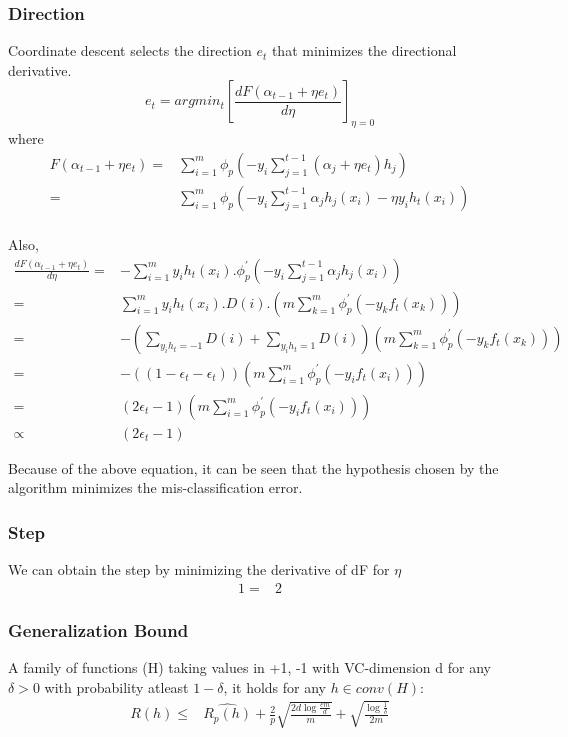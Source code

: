 \documentclass{article}
\begin{document}
\subsubsection*{Direction}
Coordinate descent selects the direction $e_{t}$ that minimizes the directional derivative.
\begin{equation*}
  e_{t} = argmin_{t}{[\frac{dF(\alpha_{t-1} + \eta e_{t} )}{d\eta}]}_{\eta = 0}
\end{equation*}
where 
\begin{align*}
  F(\alpha_{t-1} + \eta e_{t} ) = & \sum_{i=1}^{m} \phi_{p} \left( -y_{i}\sum_{j=1}^{t-1} (\alpha_{j} + \eta e_{t})h_{j} \right) \\
  = & \sum_{i=1}^{m} \phi_{p} \left( -y_{i}\sum_{j=1}^{t-1} \alpha_{j}h_{j}(x_{i}) - \eta y_{i}h_{t}(x_{i}) \right)\\
\end{align*}

Also,
\begin{align*}
  \frac{dF(\alpha_{t-1} + \eta e_{t} )}{d\eta} = & -\sum_{i=1}^{m} y_{i}h_{t}(x_{i}).\phi^{'}_{p} \left( -y_{i}\sum_{j=1}^{t-1} \alpha_{j}h_{j}(x_{i}) \right) \\
  = & \sum_{i=1}^{m} y_{i}h_{t}(x_{i}).D(i).\left(m\sum_{k=1}^{m} \phi^{'}_{p}(-y_{k}f_{t}(x_{k})) \right) \\
  = & -\left(\sum_{y_{i}h_{t} = -1}D(i) + \sum_{y_{i}h_{t} = 1} D(i) \right) \left(m \sum_{k=1}^{m} \phi^{'}_{p}(-y_{k}f_{t}(x_{k}))\right) \\
  = & -\left( (1 - \epsilon_{t} - \epsilon_{t}) \right) \left( m\sum_{i = 1}^{m}\phi^{'}_{p} (-y_{i}f_{t}(x_{i})) \right) \\
  = & (2\epsilon_{t} - 1)\left( m\sum_{i = 1}^{m}\phi^{'}_{p} (-y_{i}f_{t}(x_{i})) \right) \\
  \varpropto & (2\epsilon_{t} - 1)
\end{align*}

Because of the above equation, it can be seen that the hypothesis chosen by the algorithm minimizes the mis-classification error.

\subsubsection*{Step}
We can obtain the step by minimizing the derivative of dF for $\eta$
\begin{align*}
  1 =& 2
\end{align*}
\subsubsection*{Generalization Bound}
A family of functions (H) taking values in {+1, -1} with VC-dimension d for any $ \delta > 0 $ with probability atleast $ 1 - \delta $, it holds for any $h \in conv(H)$:
\begin{align*}
  R(h) \le & \hat{R_{p}(h)} + \frac{2}{p} \sqrt{\frac{2d\log{\frac{em}{d}}}{m}} + \sqrt{\frac{\log{\frac{1}{\delta}}}{2m}}
\end{align*}
\end{document}
